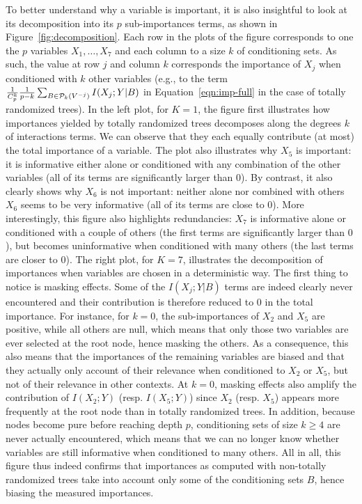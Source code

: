 To better understand why a variable is important, it is also insightful to look
at its decomposition into its $p$ sub-importances terms, as shown in
Figure~\ref{fig:decomposition}. Each row in the plots of the figure corresponds
to one the $p$ variables $X_1,\dots,X_7$ and each column to a size $k$ of conditioning sets.
As such, the value at row $j$ and column $k$ corresponds the importance of $X_j$
when conditioned with $k$ other variables (e.g., to the term $\frac{1}{C^k_p}
\frac{1}{p-k} \sum_{B \in {\cal P}_k(V^{-j})} I(X_j;Y|B)$ in Equation~\ref{eqn:imp-full}
in the case of totally randomized trees). In the left plot, for
$K=1$, the figure first illustrates how importances yielded by totally
randomized trees decomposes along the degrees $k$ of interactions terms. We can
observe that they each equally contribute (at most) the total importance of a
variable. The plot also illustrates why $X_5$ is important: it is informative
either alone or conditioned with any combination of the other variables (all of
its terms are significantly larger than $0$). By contrast, it also clearly shows
why $X_6$ is not important: neither alone nor combined with others $X_6$ seems
to be very informative (all of its terms are close to $0$). More interestingly,
this figure also highlights redundancies: $X_7$ is informative alone or
conditioned with a couple of others (the first terms are significantly larger
than $0$), but becomes uninformative  when conditioned with
many others (the last terms are closer to $0$). The right plot, for $K=7$,
illustrates the decomposition of importances when variables are chosen in a
deterministic way. The first thing to notice is masking effects. Some of the
$I(X_j;Y|B)$ terms are indeed clearly never encountered and their contribution
is therefore reduced to $0$ in the total importance. For instance, for $k=0$,
the sub-importances of $X_2$ and $X_5$ are positive, while all others are null,
which means that only those two variables are ever selected at the root node,
hence masking the others. As a consequence, this also means that the importances
of the remaining variables are biased and that they actually only account of their
relevance when conditioned to $X_2$ or $X_5$, but not of their relevance in
other contexts. At $k=0$, masking effects also amplify the contribution of $I(X_2;Y)$
(resp. $I(X_5;Y)$) since $X_2$ (resp. $X_5$) appears more frequently at the root
node than in totally randomized trees. In addition, because nodes become pure
before reaching depth $p$, conditioning sets of size $k\geq4$ are never actually
encountered, which means that we can no longer know whether variables are still
informative when conditioned to many others. All in all, this figure thus indeed
confirms that importances as computed with non-totally randomized trees take
into account only some of the conditioning sets $B$, hence biasing the measured
importances.

